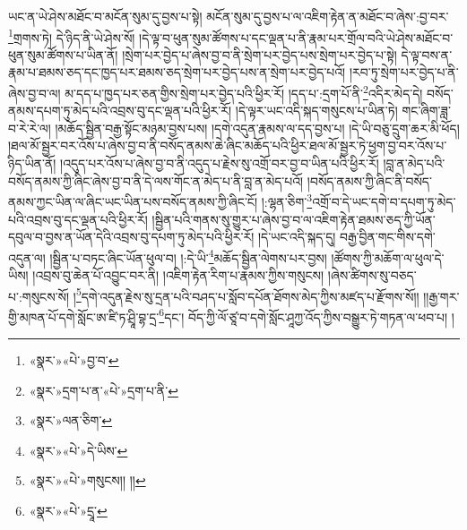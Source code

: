 ཡང་ན་ཡེ་ཤེས་མཐོང་བ་མངོན་སུམ་དུ་བྱས་པ་སྟེ། མངོན་སུམ་དུ་བྱས་པ་ལ་འཇིག་རྟེན་ན་མཐོང་བ་ཞེས་:བྱ་བར་\footnote{«སྣར་»«པེ་»བྱ་བ་}གྲགས་ཏེ། དེ་ཉིད་ནི་ཡེ་ཤེས་སོ། །དེ་ལྟ་བ་ཕུན་སུམ་ཚོགས་པ་དང་ལྡན་པ་ནི་རྣམ་པར་གྲོལ་བའི་ཡེ་ཤེས་མཐོང་བ་ཕུན་སུམ་ཚོགས་པ་ཡིན་ནོ། །སྲེག་པར་བྱེད་པ་ཞེས་བྱ་བ་ནི་སྲེག་པར་བྱེད་པས་སྲེག་པར་བྱེད་པ་སྟེ། དེ་ལྟ་བས་ན་རྣམ་པ་ཐམས་ཅད་དང་ཁྱད་པར་ཐམས་ཅད་སྲེག་པར་བྱེད་པས་ན་སྲེག་པར་བྱེད་པའོ། །རབ་ཏུ་སྲེག་པར་བྱེད་པ་ནི་ཞེས་བྱ་བ་ལ། མ་དད་པ་ཁྱད་པར་ཅན་གྱིས་སྲེག་པར་བྱེད་པའི་ཕྱིར་རོ། །དད་པ་:དྲག་པོ་ནི་\footnote{«སྣར་»དྲག་པ་ན་«པེ་»དྲག་པ་ནི་}འདིར་མེད་དེ། བསོད་ནམས་དཔག་ཏུ་མེད་པའི་འབྲས་བུ་དང་ལྡན་པའི་ཕྱིར་རོ། །དེ་ལྟར་ཡང་འདི་སྐད་གསུངས་པ་ཡིན་ཏེ། གང་ཞིག་ཟླ་བ་རེ་རེ་ལ། །མཆོད་སྦྱིན་བརྒྱ་སྟོང་མཉམ་བྱས་པས། །དགེ་འདུན་རྣམས་ལ་དད་བྱས་པ། །དེ་ཡི་བཅུ་དྲུག་ཆར་མི་ཕོད། །ཐལ་མོ་སྦྱར་བར་འོས་པ་ཞེས་བྱ་བ་ནི་བསོད་ནམས་ཆེ་ཞིང་མཆོད་པའི་ཕྱིར་ཐལ་མོ་སྦྱར་ཏེ་ཕྱག་བྱ་བར་འོས་པ་ཉིད་ཡིན་ནོ། །འདུད་པར་འོས་པ་ཞེས་བྱ་བ་ནི་འདུད་པ་རྗེས་སུ་འགྲོ་བར་བྱ་བ་ཡིན་པའི་ཕྱིར་རོ། །བླ་ན་མེད་པའི་བསོད་ནམས་ཀྱི་ཞིང་ཞེས་བྱ་བ་ནི་དེ་ལས་གོང་ན་མེད་པ་ནི་བླ་ན་མེད་པའོ། །བསོད་ནམས་ཀྱི་ཞིང་ནི་བསོད་ནམས་ཀྱང་ཡིན་ལ་ཞིང་ཡང་ཡིན་པས་བསོད་ནམས་ཀྱི་ཞིང་ངོ། །:ལྷན་ཅིག་\footnote{«སྣར་»ལན་ཅིག་}འགྲོ་བ་དེ་ཡང་དགེ་བ་དཔག་ཏུ་མེད་པའི་འབྲས་བུ་དང་ལྡན་པའི་ཕྱིར་རོ། །སྦྱིན་པའི་གནས་སུ་གྱུར་པ་ཞེས་བྱ་བ་ལ་འཇིག་རྟེན་ཐམས་ཅད་ཀྱི་ཡོན་དབུལ་བ་བྱས་ན་ཡོན་དེའི་འབྲས་བུ་དཔག་ཏུ་མེད་པའི་ཕྱིར་རོ། །དེ་ཡང་འདི་སྐད་དུ། བརྒྱ་བྱིན་གང་གིས་དགེ་འདུན་ལ། །སྦྱིན་པ་བཏང་ཞིང་ཡོན་ཕུལ་བ། །:དེ་ཡི་\footnote{«སྣར་»«པེ་»དེ་ཡིས་}མཆོད་སྦྱིན་ལེགས་པར་བྱས། །ཚོགས་ཀྱི་མཆོག་ལ་ཕུལ་དེ་ཡིས། །འབྲས་བུ་ཆེན་པོ་འབྱུང་བར་ནི། །འཇིག་རྟེན་རིག་པ་རྣམས་ཀྱིས་གསུངས། །ཞེས་ཚིགས་སུ་བཅད་པ་:གསུངས་སོ། །\footnote{«སྣར་»«པེ་»གསུངས།། །།}དགེ་འདུན་རྗེས་སུ་དྲན་པའི་བཤད་པ་སློབ་དཔོན་ཐོགས་མེད་ཀྱིས་མཛད་པ་རྫོགས་སོ།། །།རྒྱ་གར་གྱི་མཁན་པོ་དགེ་སློང་ཨ་ཛི་ཏ་ཤྲཱི་བྷ་དྲ་\footnote{«སྣར་»«པེ་»དྲཱ་}དང་། བོད་ཀྱི་ལོ་ཙཱ་བ་དགེ་སློང་ཤཱཀྱ་འོད་ཀྱིས་བསྒྱུར་ཏེ་གཏན་ལ་ཕབ་པ། ། 